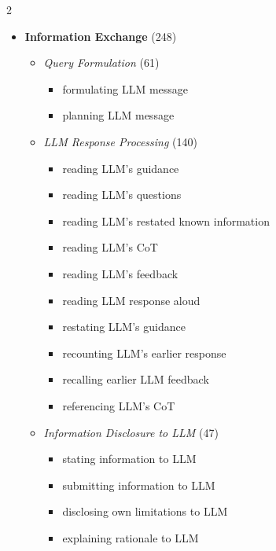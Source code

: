 \begin{multicols}{2}
\begin{itemize}[leftmargin=*, itemsep=2pt, topsep=0pt]
        \columnbreak
        \item \textbf{Information Exchange} (248)
        \begin{itemize}[leftmargin=*, nosep]
            \item \textit{Query Formulation} (61)
            \begin{itemize}[leftmargin=*, nosep]
                \item formulating \ac{LLM} message
                \item planning \ac{LLM} message
            \end{itemize}
            \item \textit{\ac{LLM} Response Processing} (140)
            \begin{itemize}[leftmargin=*, nosep]
                \item reading \ac{LLM}'s guidance
                \item reading \ac{LLM}'s questions
                \item reading \ac{LLM}'s restated known information
                \item reading \ac{LLM}'s \ac{CoT}
                \item reading \ac{LLM}'s feedback
                \item reading \ac{LLM} response aloud
                \item restating \ac{LLM}'s guidance
                \item recounting \ac{LLM}'s earlier response
                \item recalling earlier \ac{LLM} feedback
                \item referencing \ac{LLM}'s \ac{CoT}
            \end{itemize}
            \item \textit{Information Disclosure to \ac{LLM}} (47)
            \begin{itemize}[leftmargin=*, nosep]
                \item stating information to \ac{LLM}
                \item submitting information to \ac{LLM}
                \item disclosing own limitations to \ac{LLM}
                \item explaining rationale to \ac{LLM}
            \end{itemize}
        \end{itemize}


\end{itemize}
\end{multicols}
